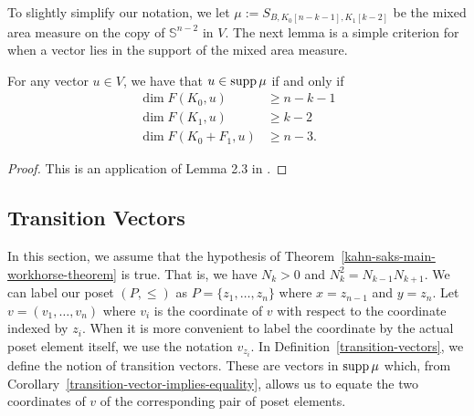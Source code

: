 \documentclass{puthesis-UG}
\begin{document}
To slightly simplify our notation, we let $\mu := S_{B, K_0[n-k-1], K_1[k-2]}$ be the mixed area measure on the copy of $\mathbb{S}^{n-2}$ in $V$. The next lemma is a simple criterion for when a vector lies in the support of the mixed area measure. 

\begin{lem} \label{kahn-saks-conditions-for-being-in-support-area-measure-lemma}
	For any vector $u \in V$, we have that $u \in \operatorname{supp} \mu$ if and only if 
	\begin{align*}
		\dim F(K_0, u) & \geq n-k-1 \\
		\dim F(K_1, u) & \geq k-2 \\
		\dim F(K_0 + F_1, u) & \geq n-3.
	\end{align*}
\end{lem}

\begin{proof}
	This is an application of Lemma 2.3 in \cite{shenfeld2022extremals}.
\end{proof}

\subsection{Transition Vectors}

In this section, we assume that the hypothesis of Theorem~\ref{kahn-saks-main-workhorse-theorem} is true. That is, we have $N_k > 0$ and $N_k^2 = N_{k-1} N_{k+1}$. We can label our poset $(P, \leq)$ as $P = \{z_1, \ldots, z_n\}$ where $x = z_{n-1}$ and $y = z_n$. Let $v = (v_1, \ldots, v_n)$ where $v_i$ is the coordinate of $v$ with respect to the coordinate indexed by $z_i$. When it is more convenient to label the coordinate by the actual poset element itself, we use the notation $v_{z_i}$. In Definition~\ref{transition-vectors}, we define the notion of transition vectors. These are vectors in $\operatorname{supp} \mu$ which, from Corollary~\ref{transition-vector-implies-equality}, allows us to equate the two coordinates of $v$ of the corresponding pair of poset elements.
\end{document}
